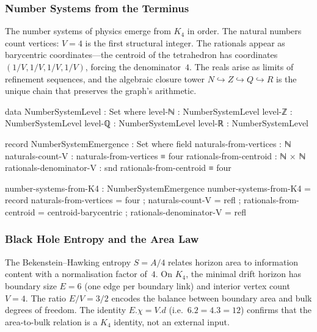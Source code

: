 \documentclass[11pt,a4paper]{book}
\def\cdot{.}%
\def\mathbb#1{#1}%
\begin{document}
\subsubsection*{Number Systems from the Terminus}

The number systems of physics emerge from $K_4$ in order.  The natural
numbers count vertices: $V = 4$ is the first structural integer.  The
rationals appear as barycentric coordinates---the centroid of the
tetrahedron has coordinates $(1/V, 1/V, 1/V, 1/V)$, forcing the
denominator~$4$.  The reals arise as limits of refinement sequences, and
the algebraic closure tower
$\mathbb{N} \hookrightarrow \mathbb{Z} \hookrightarrow \mathbb{Q}
\hookrightarrow \mathbb{R}$
is the unique chain that preserves the graph's arithmetic.

\begin{code}
data NumberSystemLevel : Set where
  level-ℕ : NumberSystemLevel
  level-ℤ : NumberSystemLevel
  level-ℚ : NumberSystemLevel
  level-ℝ : NumberSystemLevel

record NumberSystemEmergence : Set where
  field
    naturals-from-vertices : ℕ
    naturals-count-V : naturals-from-vertices ≡ four
    rationals-from-centroid : ℕ × ℕ
    rationals-denominator-V : snd rationals-from-centroid ≡ four

number-systems-from-K4 : NumberSystemEmergence
number-systems-from-K4 = record
  { naturals-from-vertices = four ; naturals-count-V = refl
  ; rationals-from-centroid = centroid-barycentric ; rationals-denominator-V = refl }
\end{code}

\subsubsection*{Black Hole Entropy and the Area Law}

The Bekenstein--Hawking entropy $S = A / 4$ relates horizon area to
information content with a normalisation factor of~$4$.  On $K_4$,
the minimal drift horizon has boundary size $E = 6$ (one edge per
boundary link) and interior vertex count $V = 4$.  The ratio
$E / V = 3/2$ encodes the balance between boundary area and bulk
degrees of freedom.  The identity $E \cdot \chi = V \cdot d$ (i.e.\
$6 \cdot 2 = 4 \cdot 3 = 12$) confirms that the area-to-bulk
relation is a $K_4$ identity, not an external input.
\end{document}
